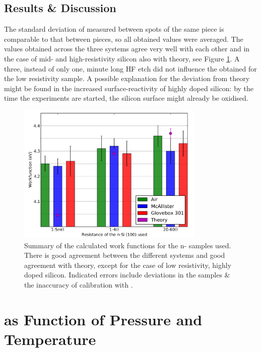 \subsection{Results \& Discussion}
The standard deviation of measured \cpd{} between spots of the same piece is comparable to that between pieces, so all obtained values were averaged. The values obtained across the three systems agree very well with each other and in the case of mid- and high-resistivity silicon also with theory, see Figure \ref{fig:nsih}. A three,  instead of only one, minute long HF etch did not influence the \cpd{} obtained for the low resistivity sample. A possible explanation for the deviation from theory might be found in the increased surface-reactivity of highly doped silicon: by the time the experiments are started, the silicon surface might already be oxidised. 
\begin{figure}
\centering
	\includegraphics[width=0.8\textwidth]{./figs/chap2/Sih}
\caption{Summary of the calculated work functions for the n-\sih{} samples used. There is good agreement between the different systems and good agreement with theory, except for the case of low resistivity, highly doped silicon. Indicated errors include deviations in the samples \& the inaccuracy of calibration with \hopg{}.}
	\label{fig:nsih}
\end{figure}


\section{\cpd{} as Function of Pressure and Temperature}
